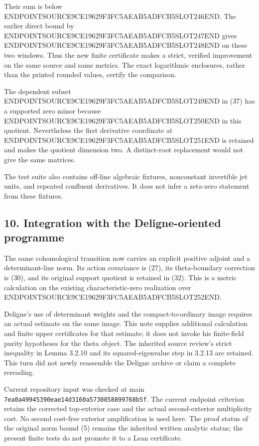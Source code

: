 Their sum is below ENDPOINTSOURCE9CE19629F3FC5AEAB5ADFCB5SLOT246END. The earlier direct bound by ENDPOINTSOURCE9CE19629F3FC5AEAB5ADFCB5SLOT247END gives ENDPOINTSOURCE9CE19629F3FC5AEAB5ADFCB5SLOT248END on these two windows. Thus the new finite certificate makes a strict, verified improvement on the same source and same metrics. The exact logarithmic enclosures, rather than the printed rounded values, certify the comparison.

The dependent subset ENDPOINTSOURCE9CE19629F3FC5AEAB5ADFCB5SLOT249END in (37) has a supported zero minor because ENDPOINTSOURCE9CE19629F3FC5AEAB5ADFCB5SLOT250END in this quotient. Nevertheless the first derivative coordinate at ENDPOINTSOURCE9CE19629F3FC5AEAB5ADFCB5SLOT251END is retained and makes the quotient dimension two. A distinct-root replacement would not give the same matrices.

The test suite also contains off-line algebraic fixtures, nonconstant invertible jet units, and repeated confluent derivatives. It does not infer a zeta-zero statement from these fixtures.

\subsection{10. Integration with the Deligne-oriented programme}\label{endpoint-restriction_original--integration-with-the-deligne-oriented-programme}

The same cohomological transition now carries an explicit positive adjoint and a determinant-line norm. Its action covariance is (27), its theta-boundary correction is (30), and its original support quotient is retained in (32). This is a metric calculation on the existing characteristic-zero realization over ENDPOINTSOURCE9CE19629F3FC5AEAB5ADFCB5SLOT252END.

Deligne's use of determinant weights and the compact-to-ordinary image requires an actual estimate on the same image. This note supplies additional calculation and finite upper certificates for that estimate; it does not invoke his finite-field purity hypotheses for the theta object. The inherited source review's strict inequality in Lemma 3.2.10 and its squared-eigenvalue step in 3.2.13 are retained. This turn did not newly reassemble the Deligne archive or claim a complete rereading.

Current repository input was checked at main \texttt{7ea0a49945390eae14d3160a5730858899768b5f}. The current endpoint criterion retains the corrected top-exterior case and the actual second-exterior multiplicity cost. No second cost-free exterior amplification is used here. The proof status of the original norm bound (5) remains the inherited written analytic status; the present finite tests do not promote it to a Lean certificate.

